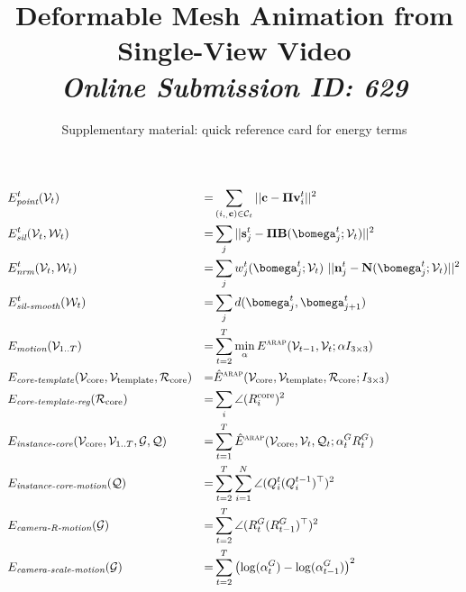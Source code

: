 \documentclass{acmsiggraph}
\begin{document}
\onecolumn

\title{\Large Deformable Mesh Animation from Single-View Video
\\{\footnotesize \em Online Submission ID: 629}}

\author{\normalsize Supplementary material: quick reference card for energy terms}

\maketitle
\vspace{-8mm}
\def\ED{D}
\def\earap{E^\text{\sc{arap}}}
\def\Estar{\cE^\ast}
\def\earaptag{\hat{E}^\text{\sc{arap}}}
\def\Rtag#1{R^{\text{#1}}}
\def\cRtag#1{\cR_{\text{#1}}}
\def\ic{{\ensuremath{\text{\sc ic}}}}
\def\ict{{\ensuremath{\text{\sc ic},t}}}
\def\ictall{{\ensuremath{\text{\sc ic},1..T}}}

\begin{align*}
&\E{point}^t(\cV_t) & = & \sum_{(i,_,\bc)\in\cC_t} || \bc - \bPi \bv_i^t ||^2
\\
&\E{sil}^t(\cV_t, \cW_t) & = & \sum_j || \bs_j^t - \bPi \bB(\bomega_j^t; \cV_t) ||^2
\\
&\E{nrm}^t(\cV_t, \cW_t) & = &\sum_j w_j^t(\bomega_j^t; \cV_t)\ || \bn_j^t - \bN(\bomega_j^t; \cV_t) ||^2
\\
&\E{sil-smooth}^t(\cW_t) & = &\sum_j d(\bomega_j^t, \bomega_{j+1}^t)
\\
&\E{motion}(\cV_{1..T}) & = &\sum_{t=2}^T \min_\alpha \earap(\cV_{t-1}, \cV_t; \alpha I_{3\times3}) 
\\
&\E{core-template}(\Vcore,\Vtemplate,\cRtag{core}) & = &\earaptag(\Vcore, \Vtemplate, \cRtag{core}; I_{3\times3})
\\
&\E{core-template-reg}(\cRtag{core}) & = &\sum_i \angle(\Rtag{core}_i)^2
\\
&\E{instance-core}(\Vcore,\cV_{1..T},\cG,\cQ) & = &\sum_{t=1}^T \earaptag(\Vcore,\cV_t, \cQ_t;\alpha^G_t R^G_t)
\\
&\E{instance-core-motion}(\cQ) & = &\sum_{t=2}^T \sum_{i=1}^N \angle( Q^t_i (Q^{t-1}_i)^\top ) ^2
\\
&\E{camera-R-motion}(\cG) &= &\sum_{t=2}^T \angle(R^G_t (R^G_{t-1})^\top)^2
\\
&\E{camera-scale-motion}(\cG) &=& \sum_{t=2}^T \left ( \log(\alpha^G_{t}) - \log(\alpha^G_{t-1}) \right )^2
\end{align*}
\end{document}
